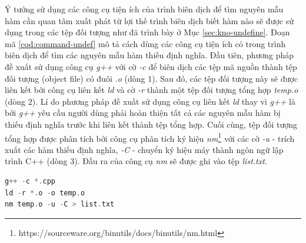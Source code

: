Ý tưởng sử dụng các công cụ tiện ích của trình biên dịch để tìm nguyên mẫu hàm cần quan tâm xuất phát từ lợi thế trình biên dịch biết hàm nào sẽ được sử dụng trong các tệp đối tượng như đã trình bày ở Mục \autoref{sec:kno-undefine}. Đoạn mã \autoref{cod:command-undef} mô tả cách dùng các công cụ tiện ích có trong trình biên dịch để tìm các nguyên mẫu hàm thiếu định nghĩa. Đầu tiên, phương pháp đề xuất sử dụng công cụ \textit{g++} với cờ \textit{-c} để biên dịch các tệp mã nguồn thành tệp đối tượng (object file) có đuôi \textit{.o} (dòng 1). Sau đó, các tệp đối tượng này sẽ được liên kết bởi công cụ liên kết \textit{ld} và cờ \textit{-r} thành một tệp đối tượng tổng hợp \textit{temp.o} (dòng 2). Lí do phương pháp đề xuất sử dụng công cụ liên kết \textit{ld} thay vì \textit{g++} là bởi \textit{g++} yêu cầu người dùng phải hoàn thiện tất cả các nguyên mẫu hàm bị thiếu định nghĩa trước khi liên kết thành tệp tổng hợp. Cuối cùng, tệp đối tượng tổng hợp được phân tích bởi công cụ phân tích ký hiệu \textit{nm}\footnote{https://sourceware.org/binutils/docs/binutils/nm.html} với các cờ \textit{-u} - trích xuất các hàm thiếu định nghĩa, \textit{-C} - chuyển ký hiệu máy thành ngôn ngữ lập trình C++ (dòng 3). Đầu ra của công cụ \textit{nm} sẽ được ghi vào tệp \textit{list.txt}.\\

\begin{lstlisting}[language=C++, caption={Các câu lệnh tìm nguyên mẫu hàm thiếu định nghĩa cần quan tâm sử dụng trình biên dịch.}, label={cod:command-undef},  captionpos=b]
g++ -c *.cpp
ld -r *.o -o temp.o
nm temp.o -u -C > list.txt
\end{lstlisting}


